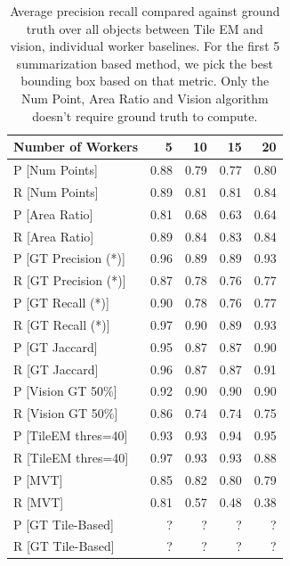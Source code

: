 \documentclass[letterpaper]{article} %
\begin{document}
\begin{table}[ht!]
\begin{tabular}{lrrrr}
\hline
 Number of Workers   &    5 &   10 &   15 &   20 \\
\hline
 P [Num Points]      & 0.88 & 0.79 & 0.77 & 0.80 \\
 R [Num Points]      & 0.89 & 0.81 & 0.81 & 0.84 \\
 P [Area Ratio]      & 0.81 & 0.68 & 0.63 & 0.64 \\
 R [Area Ratio]      & 0.89 & 0.84 & 0.83 & 0.84 \\
 P [GT Precision (*)]    & 0.96 & 0.89 & 0.89 & 0.93 \\
 R [GT Precision (*)]    & 0.87 & 0.78 & 0.76 & 0.77 \\
 P [GT Recall (*)]       & 0.90 & 0.78 & 0.76 & 0.77 \\
 R [GT Recall (*)]       & 0.97 & 0.90 & 0.89 & 0.93 \\
 P [GT Jaccard]      & 0.95 & 0.87 & 0.87 & 0.90 \\
 R [GT Jaccard]      & 0.96 & 0.87 & 0.87 & 0.91 \\
 \hline
 P [Vision GT 50\%]   & 0.92 & 0.90 & 0.90 & 0.90 \\
 R [Vision GT 50\%]   & 0.86 & 0.74 & 0.74 & 0.75 \\
 \hline
 P [TileEM thres=40] & 0.93 & 0.93 & 0.94 & 0.95 \\
 R [TileEM thres=40] & 0.97 & 0.93 & 0.93 & 0.88 \\
 P [MVT]             & 0.85 & 0.82 & 0.80 & 0.79 \\
 R [MVT]             & 0.81 & 0.57 & 0.48 & 0.38 \\
 P [GT Tile-Based]  & ? & ? & ? &? \\
 R [GT Tile-Based]  & ? & ? & ? &? \\
\hline
\end{tabular}
\caption{Average precision recall compared against ground truth over all objects between Tile EM and vision, individual worker baselines. For the first 5 summarization based method, we pick the best bounding box based on that metric. Only the Num Point, Area Ratio and Vision algorithm doesn't require ground truth to compute.}
\end{table}
\end{document}
